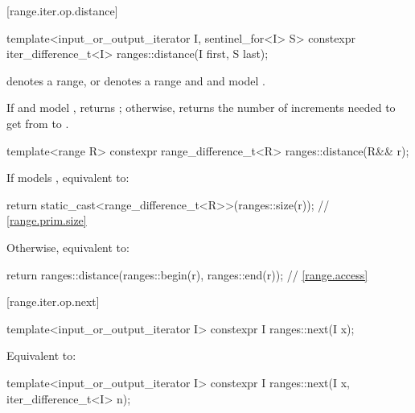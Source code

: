 [range.iter.op.distance]{}
%
\begin{itemdecl}
template<input_or_output_iterator I, sentinel_for<I> S>
  constexpr iter_difference_t<I> ranges::distance(I first, S last);
\end{itemdecl}

\begin{itemdescr}
\pnum
\expects
{} denotes a range, or
 denotes a range and
 and  model
.

\pnum
\effects
If  and  model ,
returns ;
otherwise, returns the number of increments needed to get from
to
.
\end{itemdescr}

%
\begin{itemdecl}
template<range R>
  constexpr range_difference_t<R> ranges::distance(R&& r);
\end{itemdecl}

\begin{itemdescr}
\pnum
\effects
If  models , equivalent to:
\begin{codeblock}
return static_cast<range_difference_t<R>>(ranges::size(r));     // \ref{range.prim.size}
\end{codeblock}
Otherwise, equivalent to:
\begin{codeblock}
return ranges::distance(ranges::begin(r), ranges::end(r));      // \ref{range.access}
\end{codeblock}
\end{itemdescr}

[range.iter.op.next]{}

%
\begin{itemdecl}
template<input_or_output_iterator I>
  constexpr I ranges::next(I x);
\end{itemdecl}

\begin{itemdescr}
\pnum
\effects
Equivalent to: 
\end{itemdescr}

%
\begin{itemdecl}
template<input_or_output_iterator I>
  constexpr I ranges::next(I x, iter_difference_t<I> n);
\end{itemdecl}

